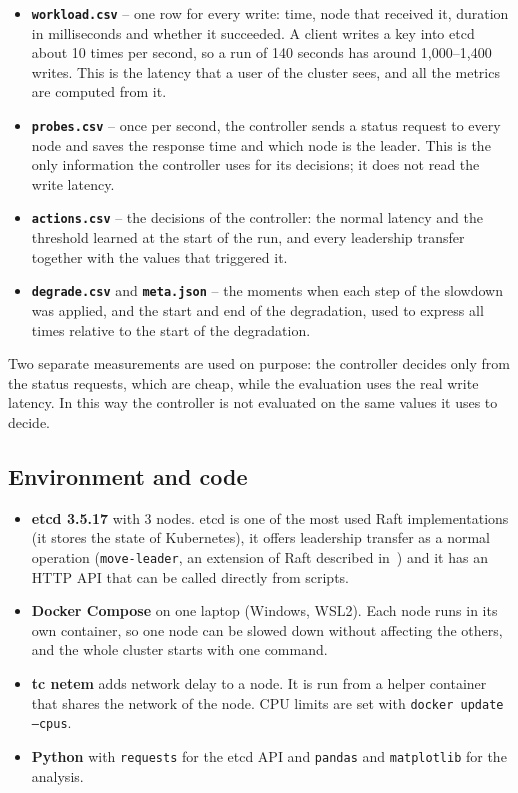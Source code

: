\documentclass[11pt,a4paper]{article}
\begin{document}
\begin{itemize}
  \item \textbf{\texttt{workload.csv}} -- one row for every write: time, node that received it, duration in milliseconds and whether it succeeded. A client writes a key into etcd about 10 times per second, so a run of 140 seconds has around 1{,}000--1{,}400 writes. This is the latency that a user of the cluster sees, and all the metrics are computed from it.
  \item \textbf{\texttt{probes.csv}} -- once per second, the controller sends a status request to every node and saves the response time and which node is the leader. This is the only information the controller uses for its decisions; it does not read the write latency.
  \item \textbf{\texttt{actions.csv}} -- the decisions of the controller: the normal latency and the threshold learned at the start of the run, and every leadership transfer together with the values that triggered it.
  \item \textbf{\texttt{degrade.csv}} and \textbf{\texttt{meta.json}} -- the moments when each step of the slowdown was applied, and the start and end of the degradation, used to express all times relative to the start of the degradation.
\end{itemize}

Two separate measurements are used on purpose: the controller decides only from the status requests, which are cheap, while the evaluation uses the real write latency. In this way the controller is not evaluated on the same values it uses to decide.

\subsection{Environment and code}

\begin{itemize}
  \item \textbf{etcd 3.5.17} with 3 nodes. etcd is one of the most used Raft implementations (it stores the state of Kubernetes), it offers leadership transfer as a normal operation (\texttt{move-leader}, an extension of Raft described in~\cite{ongarothesis}) and it has an HTTP API that can be called directly from scripts.
  \item \textbf{Docker Compose} on one laptop (Windows, WSL2). Each node runs in its own container, so one node can be slowed down without affecting the others, and the whole cluster starts with one command.
  \item \textbf{tc netem} adds network delay to a node. It is run from a helper container that shares the network of the node. CPU limits are set with \texttt{docker update --cpus}.
  \item \textbf{Python} with \texttt{requests} for the etcd API and \texttt{pandas} and \texttt{matplotlib} for the analysis.
\end{itemize}
\end{document}
